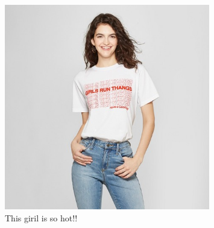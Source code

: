 \documentclass{article}
\begin{document}
\begin{figure}
\includegraphics[width=0.8\textwidth]{photo/girl.jpg}
\caption{This giril is so hot!!}
\end{figure}
\end{document}
